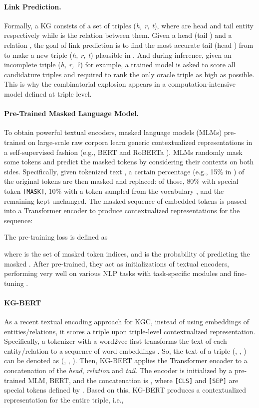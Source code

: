\documentclass[sigconf]{acmart}
\begin{document}
\paragraph{Link Prediction.}
Formally, a KG  consists of a set of triples (\textit{h, r, t}), where  are head and tail entity respectively while  is the relation between them. 
Given a head  (tail ) and a relation , the goal of link prediction is to find the most accurate tail  (head ) from  to make a new triple (\textit{h, r, t}) plausible in . 
And during inference, given an incomplete triple (\textit{h, r, ?}) for example, a trained model is asked to score all candidature triples  and required to rank the only oracle triple  as high as possible. This is why the combinatorial explosion appears in a computation-intensive model defined at triple level.

\paragraph{Pre-Trained Masked Language Model.}  To obtain powerful textual encoders, masked language models (MLMs) pre-trained on large-scale raw corpora learn generic contextualized representations in a self-supervised fashion (e.g., BERT \citep{BERT} and RoBERTa \cite{RoBERTa}). 
MLMs randomly mask some tokens and predict the masked tokens by considering their contexts on both sides. Specifically, given tokenized text , a certain percentage (e.g., 15\% in \cite{BERT}) of the original tokens are then masked and replaced: of those, 80\% with special token \texttt{[MASK]}, 10\% with a token sampled from the vocabulary , and the remaining kept unchanged. The masked sequence of embedded tokens  is passed into a Transformer encoder \cite{transformer} to produce contextualized representations for the sequence:

The pre-training loss is defined as 

where  is the set of masked token indices, and  is the probability of predicting the masked .
After pre-trained, they act as initializations of textual encoders, performing very well on various NLP tasks with task-specific modules and fine-tuning \cite{BERT}. 


\paragraph{KG-BERT} 
As a recent textual encoding approach \cite{yao2019kgbert} for KGC, 
instead of using embeddings of entities/relations, it scores a triple upon triple-level contextualized representation. 
Specifically, a tokenizer with a word2vec \cite{mikolov2013distributed,pennington2014glove} first transforms the text  of each entity/relation to a sequence of word embeddings . 
So, the text of a triple (, , ) can be denoted as (, , ). 
Then, KG-BERT applies the Transformer encoder \cite{transformer} to a concatenation of the \textit{head}, \textit{relation} and \textit{tail}. The encoder is initialized by a pre-trained MLM, BERT, and the concatenation is 
, where \texttt{[CLS]} and \texttt{[SEP]} are special tokens defined by \citet{BERT}.
Based on this, KG-BERT produces a contextualized representation  for the entire triple, i.e.,
\end{document}
